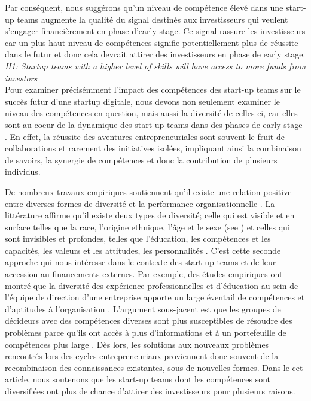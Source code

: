 \documentclass[12pt]{article}
\begin{document}
Par conséquent, nous suggérons qu'un niveau de compétence élevé dans une start-up teams augmente la qualité du signal destinés aux investisseurs qui veulent s'engager financièrement en phase d'early stage. Ce signal rassure les investisseurs car un plus haut niveau de compétences signifie potentiellement plus de réussite dans le futur et donc cela devrait attirer des investisseurs en phase de early stage. \\

\noindent \textit{H1: Startup teams with a higher level of skills will have access to more funds from investors} \\

Pour examiner précisémment l'impact des compétences des start-up teams sur le succès futur d'une startup digitale, nous devons non seulement examiner le niveau des compétences en question, mais aussi la diversité de celles-ci, car elles sont au coeur de la dynamique des start-up teams dans des phases de early stage \citep{grillitsch2021does}. En effet, la réussite des aventures entrepreneuriales sont souvent le fruit de collaborations et rarement des initiatives isolées, impliquant ainsi la combinaison de savoirs, la synergie de compétences et donc la contribution de plusieurs individus.

De nombreux travaux empiriques soutiennent qu'il existe une relation positive entre diverses formes de diversité et la performance organisationnelle \citep{zhou2015entrepreneurial}. La littérature affirme qu'il existe deux types de diversité; celle qui est visible et en surface telles que la race, l'origine ethnique, l'âge et le sexe (see \citep{wise2022startup}) et celles qui sont invisibles et profondes, telles que l'éducation, les compétences et les capacités, les valeurs et les attitudes, les personnalités \citep{bell2007deep}. C'est cette seconde approche qui nous intéresse dans le contexte des start-up teams et de leur accession au financements externes. Par exemple, des études empiriques ont montré que la diversité des expérience professionnelles et d'éducation au sein de l'équipe de direction d'une entreprise apporte un large éventail de compétences et d'aptitudes à l'organisation \citep{beckman2007early, zarutskie2010role}. L'argument sous-jacent est que les groupes de décideurs avec des compétences diverses sont plus susceptibles de résoudre des problèmes parce qu'ils ont accès à plus d'informations et à un portefeuille de compétences plus large \citep{hong2001problem}. Dès lors, les solutions aux nouveaux problèmes rencontrés lors des cycles entrepreneuriaux proviennent donc souvent de la recombinaison des connaissances existantes, sous de nouvelles formes. Dans le cet article, nous soutenons que les start-up teams dont les compétences sont diversifiées ont plus de chance d'attirer des investisseurs pour plusieurs raisons.
\end{document}
